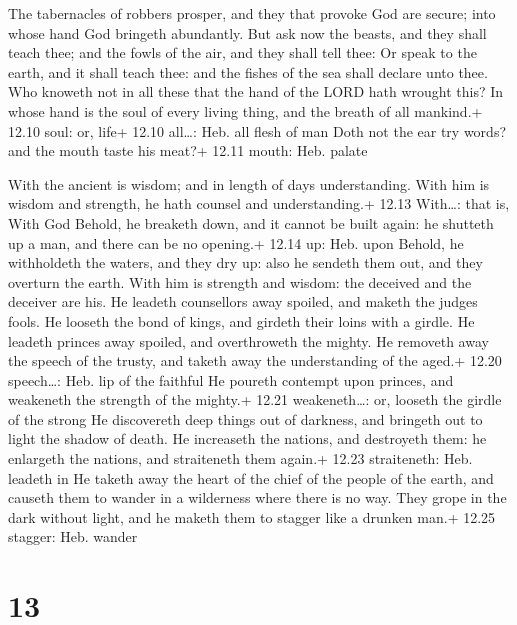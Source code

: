  The tabernacles of robbers prosper, and they that provoke
God are secure; into whose hand God bringeth abundantly. 
But ask now the beasts, and they shall teach thee; and the fowls of the
air, and they shall tell thee:  Or speak to the earth, and
it shall teach thee: and the fishes of the sea shall declare unto thee.
 Who knoweth not in all these that the hand of the LORD hath
wrought this?  In whose hand is the soul of every living
thing, and the breath of all mankind.+ 12.10 soul: or, life+ 12.10
all\ldots: Heb. all flesh of man  Doth not the ear try
words? and the mouth taste his meat?+ 12.11 mouth: Heb. palate

 With the ancient is wisdom; and in length of days
understanding.  With him is wisdom and strength, he hath
counsel and understanding.+ 12.13 With\ldots: that is, With God
 Behold, he breaketh down, and it cannot be built again: he
shutteth up a man, and there can be no opening.+ 12.14 up: Heb. upon
 Behold, he withholdeth the waters, and they dry up: also
he sendeth them out, and they overturn the earth.  With him
is strength and wisdom: the deceived and the deceiver are his.
 He leadeth counsellors away spoiled, and maketh the judges
fools.  He looseth the bond of kings, and girdeth their
loins with a girdle.  He leadeth princes away spoiled, and
overthroweth the mighty.  He removeth away the speech of
the trusty, and taketh away the understanding of the aged.+ 12.20
speech\ldots: Heb. lip of the faithful  He poureth contempt
upon princes, and weakeneth the strength of the mighty.+ 12.21
weakeneth\ldots: or, looseth the girdle of the strong  He
discovereth deep things out of darkness, and bringeth out to light the
shadow of death.  He increaseth the nations, and destroyeth
them: he enlargeth the nations, and straiteneth them again.+ 12.23
straiteneth: Heb. leadeth in  He taketh away the heart of
the chief of the people of the earth, and causeth them to wander in a
wilderness where there is no way.  They grope in the dark
without light, and he maketh them to stagger like a drunken man.+ 12.25
stagger: Heb. wander

\hypertarget{section-12}{%
\section{13}\label{section-12}}

